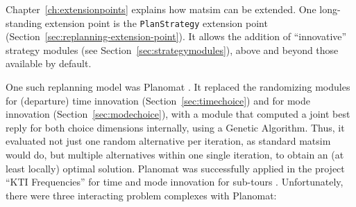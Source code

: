 Chapter~\ref{ch:extensionpoints} explains how \gls{matsim} can be extended. One long-standing extension point is the \lstinline{PlanStrategy} extension point (Section~\ref{sec:replanning-extension-point}). It allows the addition of ``innovative'' strategy modules (see Section~\ref{sec:strategymodules}), above and beyond those available by default.

One such replanning model was Planomat \citep[][]{MeisterBalmerEtc2006planomatIatbr, MeisterEtAl_STRC_2006, Meister_PhDThesis_2011}. It replaced the randomizing modules for (departure) time innovation (Section~\ref{sec:timechoice}) and for mode innovation (Section~\ref{sec:modechoice}), with a module that computed a joint best reply for both choice dimensions internally, using a Genetic Algorithm. Thus, it evaluated not just one random alternative per iteration, as standard \gls{matsim} would do, but multiple alternatives within one single iteration, to obtain an (at least locally) optimal solution. Planomat was successfully applied in the project ``KTI Frequencies'' for time and mode innovation for sub-tours \citep[][p.10]{BalmerEtAl_ResRep_datapuls_2010}.
Unfortunately, there were three interacting problem complexes with Planomat:
%

